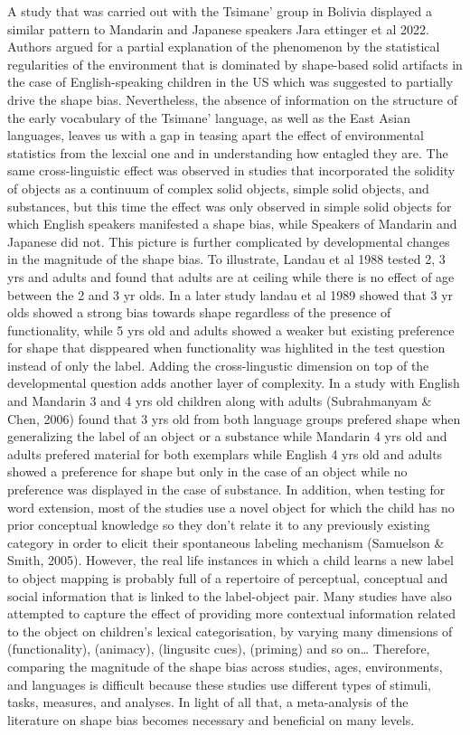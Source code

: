 \documentclass[
  man]{apa6}
\begin{document}
A study that was carried out with the Tsimane' group in Bolivia displayed a similar pattern to Mandarin and Japanese speakers Jara ettinger et al 2022. Authors argued for a partial explanation of the phenomenon by the statistical regularities of the environment that is dominated by shape-based solid artifacts in the case of English-speaking children in the US which was suggested to partially drive the shape bias. Nevertheless, the absence of information on the structure of the early vocabulary of the Tsimane' language, as well as the East Asian languages, leaves us with a gap in teasing apart the effect of environmental statistics from the lexcial one and in understanding how entagled they are.
The same cross-linguistic effect was observed in studies that incorporated the solidity of objects as a continuum of complex solid objects, simple solid objects, and substances, but this time the effect was only observed in simple solid objects for which English speakers manifested a shape bias, while Speakers of Mandarin and Japanese did not.
This picture is further complicated by developmental changes in the magnitude of the shape bias. To illustrate, Landau et al 1988 tested 2, 3 yrs and adults and found that adults are at ceiling while there is no effect of age between the 2 and 3 yr olds. In a later study landau et al 1989 showed that 3 yr olds showed a strong bias towards shape regardless of the presence of functionality, while 5 yrs old and adults showed a weaker but existing preference for shape that disppeared when functionality was highlited in the test question instead of only the label. Adding the cross-lingustic dimension on top of the developmental question adds another layer of complexity. In a study with English and Mandarin 3 and 4 yrs old children along with adults (Subrahmanyam \& Chen, 2006) found that 3 yrs old from both language groups prefered shape when generalizing the label of an object or a substance while Mandarin 4 yrs old and adults prefered material for both exemplars while English 4 yrs old and adults showed a preference for shape but only in the case of an object while no preference was displayed in the case of substance. In addition, when testing for word extension, most of the studies use a novel object for which the child has no prior conceptual knowledge so they don't relate it to any previously existing category in order to elicit their spontaneous labeling mechanism (Samuelson \& Smith, 2005). However, the real life instances in which a child learns a new label to object mapping is probably full of a repertoire of perceptual, conceptual and social information that is linked to the label-object pair. Many studies have also attempted to capture the effect of providing more contextual information related to the object on children's lexical categorisation, by varying many dimensions of (functionality), (animacy), (lingusitc cues), (priming) and so on\ldots{} Therefore, comparing the magnitude of the shape bias across studies, ages, environments, and languages is difficult because these studies use different types of stimuli, tasks, measures, and analyses. In light of all that, a meta-analysis of the literature on shape bias becomes necessary and beneficial on many levels.
\end{document}
